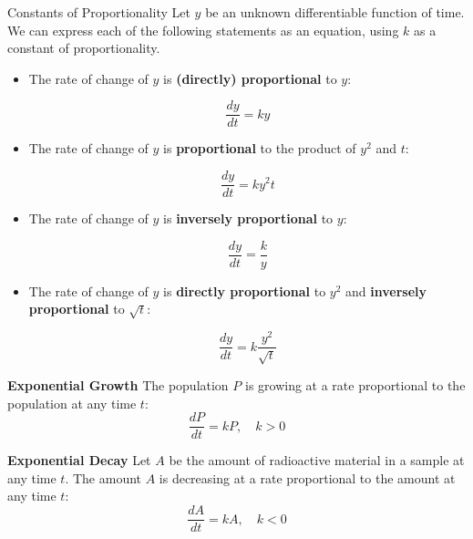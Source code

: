 \documentclass{beamer}
\begin{document}
\begin{frame}
\begin{block}{Constants of Proportionality}
Let $y$ be an unknown differentiable function of time. We can express each of the following statements as an equation, using $k$ as a constant of proportionality.
\onslide<+->
\begin{itemize}[<+- | alert@+>]
\item The rate of change of $y$ is \textbf{(directly) proportional} to $y$:

\vspace{-3mm}
\begin{equation*}
\dfrac{dy}{dt}=ky
\end{equation*}

\vspace{-2mm}
\item The rate of change of $y$ is \textbf{proportional} to the product of $y^2$ and $t$:

\vspace{-3mm}
\begin{equation*}
\dfrac{dy}{dt}=ky^2 t
\end{equation*}

\vspace{-2mm}
\item The rate of change of $y$ is \textbf{inversely proportional} to $y$:

\vspace{-3mm}
\begin{equation*}
\dfrac{dy}{dt}=\dfrac{k}{y}
\end{equation*}

\vspace{-2mm}
\item The rate of change of $y$ is \textbf{directly proportional} to $y^2$ and \textbf{inversely proportional} to $\sqrt{t}$:

\vspace{-3mm}
\begin{equation*}
\dfrac{dy}{dt}=k\dfrac{y^2}{\sqrt{t}}
\end{equation*}

\vspace{-2mm}
\end{itemize}
\end{block}
\end{frame}

\begin{frame}
\begin{example}
\textbf{Exponential Growth} The population $P$ is growing at a rate proportional to the population at any time $t$:
\begin{equation*}
\dfrac{dP}{dt}=kP,\quad k>0
\end{equation*}
\end{example}\pause
\begin{example}
\textbf{Exponential Decay} Let $A$ be the amount of radioactive material in a sample at any time $t$. The amount $A$ is decreasing at a rate proportional to the amount at any time $t$:
\begin{equation*}
\dfrac{dA}{dt}=kA,\quad k<0
\end{equation*}
\end{example}
\end{frame}
\end{document}
